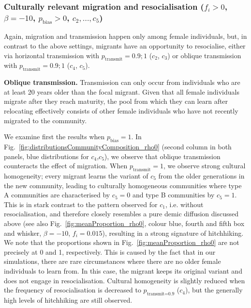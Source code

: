 \documentclass[9pt,twocolumn,twoside,lineno]{pnas-new}
\begin{document}


\subsubsection*{Culturally relevant migration and resocialisation ($f_i>0$, $\beta=-10$, $p_\text{bias}>0$, $c_2,\ldots,c_5$)}

Again, migration and transmission happen only among female individuals, but, in contrast to the above settings, migrants have an opportunity to resocialise, either via horizontal transmission with $p_\text{transmit}=0.9;1$ ($c_2$, $c_3$) or oblique transmission with $p_\text{transmit}=0.9;1$ ($c_4$, $c_5$).

{\bf Oblique transmission.} Transmission can only occur from individuals who are at least 20 years older than the focal migrant. Given that all female individuals migrate after they reach maturity, the pool from which they can learn after relocating effectively consists of other female individuals who have not recently migrated to the community. 

We examine first the results when $p_\text{bias}=1$. In Fig.~\ref{fig:distributionsCommunityComposition_rho0} (second column in both panels, blue distributions for $c_4$,$c_5$), we observe that oblique transmission counteracts the effect of migration. When $p_\text{transmit}=1$, we observe strong cultural homogeneity; every migrant learns the variant of $c_5$ from the older generations in the new community, leading to culturally homogeneous communities where type A communities are characterised by $c_5=0$ and type B communities by $c_5=1$. This is in stark contrast to the pattern observed for  $c_1$, i.e. without resocialisation, and therefore closely resembles a pure demic diffusion discussed above (see also Fig.~\ref{fig:meanProportion_rho0}, colour blue, fourth and fifth box and whisker, $\beta=-10$, $f_i=0.015$), resulting in a strong signature of hitchhiking. 
We note that the proportions shown in Fig.~\ref{fig:meanProportion_rho0} are not precisely at 0 and 1, respectively. This is caused by the fact that in our simulations, there are rare circumstances where there are no older female individuals to learn from. In this case, the migrant 
keeps its original variant and does not engage in resocialisation. 
Cultural homogeneity is slightly reduced when the frequency of resocialisation is decreased to $p_\text{transmit=0.9}$ ($c_4$), but the generally high levels of hitchhiking are still observed.
\end{document}
